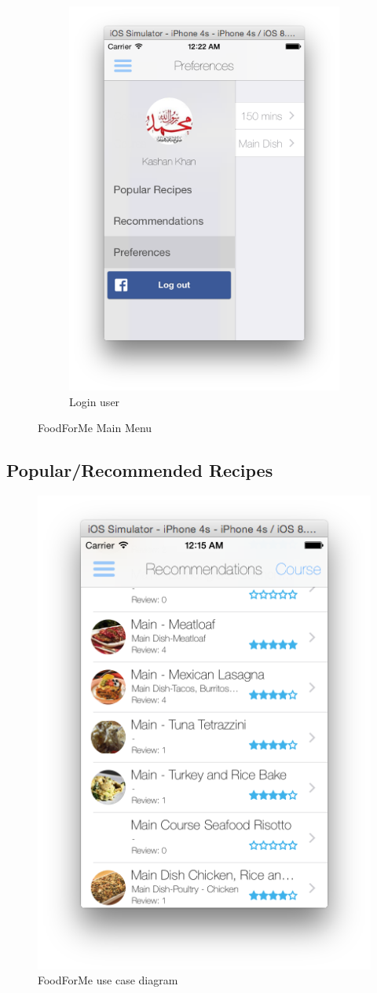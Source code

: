 \begin{figure}[h]
\begin{subfigure}{.49\textwidth}
		\includegraphics[width=.9\linewidth]{figures/ch4_app_screen_shots/main_menu/main_menu_2.png}
		\caption{Login user}
	\end{subfigure}
	\caption{FoodForMe Main Menu}
	\label{fig:foodforme_main_menu_sreen}
\end{figure}
	  
\subsection{Popular/Recommended Recipes}
 \begin{figure}[h]
 	\centering
	\includegraphics[width=.5\linewidth]{figures/ch4_app_screen_shots/recipes/recipes.png}
    \caption{FoodForMe use case diagram}
	\label{fig:foodforme_recipe_screen}
	\end{figure}
	  
